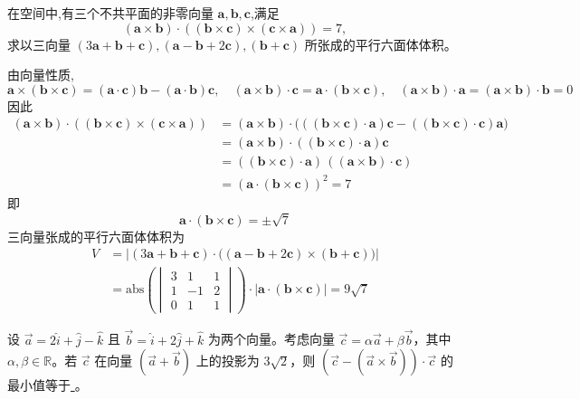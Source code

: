 \begin{questions}
    \question 在空间中,有三个不共平面的非零向量 $\textbf{a}, \textbf{b}, \textbf{c}$,满足
    \[
    (\textbf{a} \times \textbf{b}) \cdot ((\textbf{b} \times \textbf{c}) \times (\textbf{c} \times \textbf{a}))=7,
    \]
    求以三向量 $(3\textbf{a}+\textbf{b}+\textbf{c}), (\textbf{a}-\textbf{b}+2\textbf{c}), (\textbf{b}+\textbf{c})$ 所张成的平行六面体体积。
    \begin{solution}
        由向量性质,
        \[
        \textbf{a}\times (\textbf{b}\times \textbf{c})=(\textbf{a}\cdot \textbf{c})\textbf{b}- (\textbf{a}\cdot \textbf{b})\textbf{c}, 
        \quad (\textbf{a}\times \textbf{b})\cdot \textbf{c}=\textbf{a} \cdot (\textbf{b}\times \textbf{c}),
        \quad (\textbf{a}\times \textbf{b})\cdot \textbf{a} = (\textbf{a}\times \textbf{b})\cdot \textbf{b} =0
        \]
        因此
        \begin{align*}
        (\textbf{a}\times \textbf{b})\cdot ((\textbf{b}\times \textbf{c})\times (\textbf{c}\times \textbf{a}))
        &= (\textbf{a}\times \textbf{b})\cdot \big(((\textbf{b}\times \textbf{c})\cdot \textbf{a})\textbf{c} - ((\textbf{b}\times \textbf{c})\cdot \textbf{c})\textbf{a}\big) \\
        &= (\textbf{a}\times \textbf{b})\cdot ((\textbf{b}\times \textbf{c})\cdot \textbf{a})\textbf{c} \\
        &= ((\textbf{b}\times \textbf{c})\cdot \textbf{a})\,((\textbf{a}\times \textbf{b})\cdot \textbf{c}) \\
        &= (\textbf{a}\cdot (\textbf{b}\times \textbf{c}))^2 = 7
        \end{align*}
        即
        \[
        \textbf{a} \cdot (\textbf{b}\times \textbf{c}) = \pm \sqrt{7}
        \]
        三向量张成的平行六面体体积为
        \begin{align*}
        V &= \big|(3\textbf{a}+\textbf{b}+\textbf{c})\cdot  \big((\textbf{a}-\textbf{b}+2\textbf{c})\times (\textbf{b}+\textbf{c})\big)\big| \\
        &= \text{abs}\left(\begin{vmatrix} 3 & 1 & 1 \\ 1 & -1 & 2 \\ 0 & 1 & 1 \end{vmatrix}\right) \cdot |\textbf{a} \cdot (\textbf{b}\times \textbf{c})| = 9\sqrt{7}
        \end{align*}
    \end{solution}

    \question 设 $\vec{a} = 2\hat{i} + \hat{j} - \hat{k}$ 且 $\vec{b} = \hat{i} + 2\hat{j} + \hat{k}$ 为两个向量。考虑向量 $\vec{c} = \alpha\vec{a} + \beta\vec{b}$，其中 $\alpha, \beta \in \mathbb{R}$。若 $\vec{c}$ 在向量 $(\vec{a} + \vec{b})$ 上的投影为 $3\sqrt{2}$，则 $(\vec{c} - (\vec{a} \times \vec{b})) \cdot \vec{c}$ 的最小值等于\underline{ \quad}。


\end{questions}

